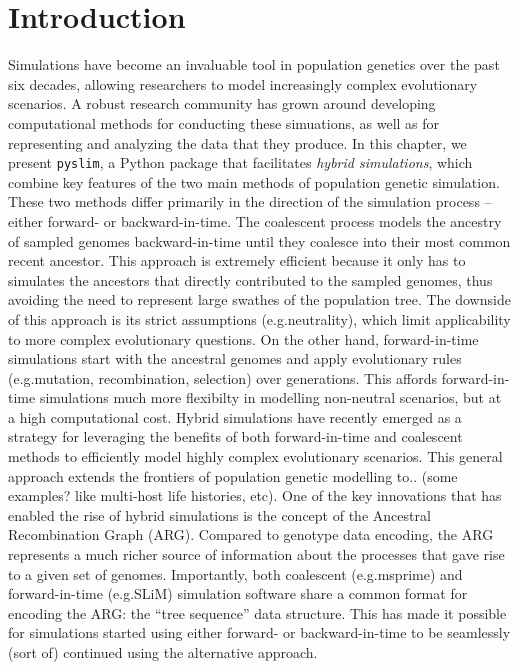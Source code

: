 \documentclass[12pt]{article}
\newcommand{\pyslim}[0]{\texttt{pyslim}\xspace}
\newcommand*{\eg}{e.g.\xcomma}
\begin{document}
\section*{Introduction}
Simulations have become an invaluable tool in population genetics over the past six decades,
allowing researchers to model increasingly complex evolutionary scenarios.
A robust research community has grown around developing computational methods for conducting these
simuations, as well as for representing and analyzing the data that they produce.
In this chapter, we present \pyslim, a Python package that facilitates \emph{hybrid simulations}, which combine key
features of the two main methods of population genetic simulation. These two methods differ primarily in the direction of the simulation
process -- either forward- or backward-in-time. The coalescent process models the ancestry of sampled genomes
backward-in-time until they coalesce into their most common recent ancestor. %
This approach is extremely efficient because it only has to simulates the ancestors that directly contributed to the sampled genomes,
thus avoiding the need to represent large swathes of the population tree. The downside of this approach is its strict assumptions
(\eg neutrality), which limit applicability to more complex evolutionary questions. On the other hand, forward-in-time simulations
start with the ancestral genomes and apply evolutionary rules (\eg mutation, recombination, selection) over generations.
This affords forward-in-time simulations much more flexibilty in modelling non-neutral scenarios, but at a high computational cost.
Hybrid simulations have recently emerged as a strategy for leveraging the benefits of both forward-in-time and coalescent methods
to efficiently model highly complex evolutionary scenarios. This general approach extends the frontiers of population genetic modelling to..
(some examples? like multi-host life histories, etc).
One of the key innovations that has enabled the rise of hybrid simulations is the concept of the Ancestral Recombination Graph (ARG).
Compared to genotype data encoding, the ARG represents a much richer source of information about the processes that gave rise
to a given set of genomes. Importantly, both coalescent (\eg msprime) and forward-in-time (\eg SLiM) simulation software share a common format for
encoding the ARG: the ``tree sequence'' data structure. This has made it possible for simulations started using either forward- or backward-in-time
to be seamlessly (sort of) continued using the alternative approach.
\end{document}
